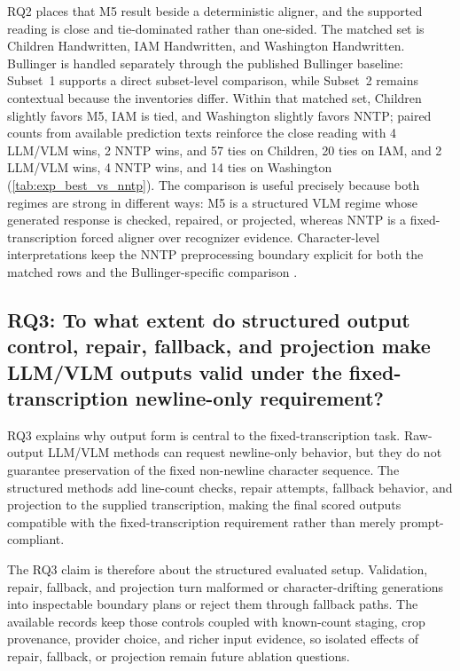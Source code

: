RQ2 places that M5 result beside a deterministic aligner, and the supported reading is close and tie-dominated rather than one-sided. The matched set is Children Handwritten, IAM Handwritten, and Washington Handwritten. Bullinger is handled separately through the published Bullinger baseline: Subset~1 supports a direct subset-level comparison, while Subset~2 remains contextual because the inventories differ. Within that matched set, Children slightly favors M5, IAM is tied, and Washington slightly favors NNTP; paired counts from available prediction texts reinforce the close reading with 4 LLM/VLM wins, 2 NNTP wins, and 57 ties on Children, 20 ties on IAM, and 2 LLM/VLM wins, 4 NNTP wins, and 14 ties on Washington (\autoref{tab:exp_best_vs_nntp}). The comparison is useful precisely because both regimes are strong in different ways: M5 is a structured VLM regime whose generated response is checked, repaired, or projected, whereas NNTP is a fixed-transcription forced aligner over recognizer evidence. Character-level interpretations keep the NNTP preprocessing boundary explicit for both the matched rows and the Bullinger-specific comparison .

\subsection{RQ3: To what extent do structured output control, repair, fallback, and projection make LLM/VLM outputs valid under the fixed-transcription newline-only requirement?}
\label{sec:conclusion_rq3}

RQ3 explains why output form is central to the fixed-transcription task. Raw-output LLM/VLM methods can request newline-only behavior, but they do not guarantee preservation of the fixed non-newline character sequence. The structured methods add line-count checks, repair attempts, fallback behavior, and projection to the supplied transcription, making the final scored outputs compatible with the fixed-transcription requirement rather than merely prompt-compliant.

The RQ3 claim is therefore about the structured evaluated setup. Validation, repair, fallback, and projection turn malformed or character-drifting generations into inspectable boundary plans or reject them through fallback paths. The available records keep those controls coupled with known-count staging, crop provenance, provider choice, and richer input evidence, so isolated effects of repair, fallback, or projection remain future ablation questions.

